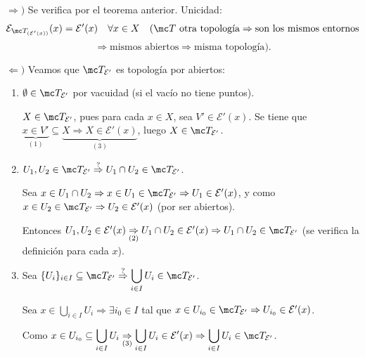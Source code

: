 \begin{dem} 
        \(\Rightarrow) \) Se verifica por el teorema anterior. Unicidad:
        \[
            \mathcal{E}_{\mc T_{(\mathcal{E}'(x))}}(x) = \mathcal{E}'(x) \quad \forall x \in X \quad (\mc T \text{ otra topología} \Rightarrow \text{son los mismos entornos} \] \[ \Rightarrow \text{mismos abiertos} \Rightarrow \text{misma topología}).
        \]
        
        \(\Leftarrow )\) Veamos que \(\mc T_{\mathcal{E}'}\) es topología por abiertos:
        \begin{enumerate}
            \item \(\emptyset \in \mc T_{\mathcal{E}'}\) por vacuidad (si el vacío no tiene puntos).
            
            \(X \in \mc T_{\mathcal{E}'}\), pues para cada \(x \in X\), sea \(V' \in \mathcal{E}'(x)\). Se tiene que \(\underbrace{x \in V'}_{(1)} \subseteq \underbrace{X \Rightarrow X \in \mathcal{E}'(x)}_{(3)}\), luego \(X \in \mc T_{\mathcal{E}'}\).
            \item \(U_1, U_2 \in \mc T_{\mathcal{E}'} \stackrel{?}{\Rightarrow} U_1 \cap U_2 \in \mc T_{\mathcal{E}'}\).
            
            Sea \(x \in U_1 \cap U_2 \Rightarrow x \in U_1 \in \mc T_{\mathcal{E}'} \Rightarrow U_1 \in \mathcal{E}'(x)\), y como \(x \in U_2 \in \mc T_{\mathcal{E}'} \Rightarrow U_2 \in \mathcal{E}'(x)\) (por ser abiertos).
            
            Entonces \(U_1, U_2 \in \mathcal{E}'(x) \underset{(2)}{\Rightarrow} U_1 \cap U_2 \in \mathcal{E}'(x) \Rightarrow U_1 \cap U_2 \in \mc T_{\mathcal{E}'}\) (se verifica la definición para cada \(x\)).
            
            \item Sea \(\{U_i\}_{i \in I} \subseteq \mc T_{\mathcal{E}'} \stackrel{?}{\Rightarrow} \displaystyle \bigcup_{i \in I} U_i \in \mc T_{\mathcal{E}'}\).
            
            Sea \(x \in \displaystyle  \bigcup_{i \in I} U_i \Rightarrow \exists i_0 \in I\) tal que \(x \in U_{i_0} \in \mc T_{\mathcal{E}'} \Rightarrow U_{i_0} \in \mathcal{E}'(x)\).
            
            Como \(x \in U_{i_0} \subseteq \displaystyle  \bigcup_{i \in I} U_i \underset{(3)}{\Rightarrow} \displaystyle  \bigcup_{i \in I} U_i \in \mathcal{E}'(x) \Rightarrow \bigcup_{i \in I} U_i \in \mc T_{\mathcal{E}'}\).
        \end{enumerate}
   

\end{dem}
